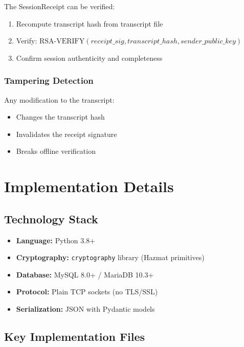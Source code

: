 \documentclass[runningheads]{llncs}
\begin{document}
The SessionReceipt can be verified:
\begin{enumerate}
    \item Recompute transcript hash from transcript file
    \item Verify: $\text{RSA-VERIFY}(receipt\_sig, transcript\_hash, sender\_public\_key)$
    \item Confirm session authenticity and completeness
\end{enumerate}

\subsubsection{Tampering Detection}

Any modification to the transcript:
\begin{itemize}
    \item Changes the transcript hash
    \item Invalidates the receipt signature
    \item Breaks offline verification
\end{itemize}

\section{Implementation Details}

\subsection{Technology Stack}

\begin{itemize}
    \item \textbf{Language:} Python 3.8+
    \item \textbf{Cryptography:} \texttt{cryptography} library (Hazmat primitives)
    \item \textbf{Database:} MySQL 8.0+ / MariaDB 10.3+
    \item \textbf{Protocol:} Plain TCP sockets (no TLS/SSL)
    \item \textbf{Serialization:} JSON with Pydantic models
\end{itemize}

\subsection{Key Implementation Files}
\end{document}
